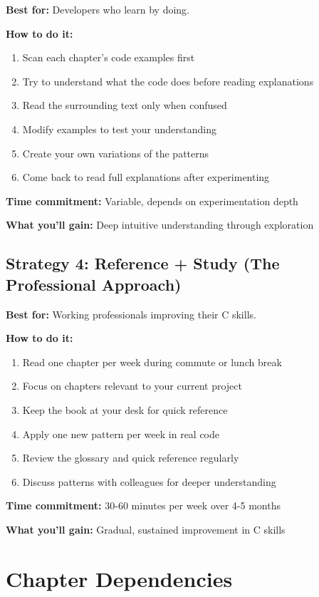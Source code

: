 \documentclass[10pt,openany]{book}
\begin{document}
\textbf{Best for:} Developers who learn by doing.

\textbf{How to do it:}
\begin{enumerate}
    \item Scan each chapter's code examples first
    \item Try to understand what the code does before reading explanations
    \item Read the surrounding text only when confused
    \item Modify examples to test your understanding
    \item Create your own variations of the patterns
    \item Come back to read full explanations after experimenting
\end{enumerate}

\textbf{Time commitment:} Variable, depends on experimentation depth

\textbf{What you'll gain:} Deep intuitive understanding through exploration

\subsection*{Strategy 4: Reference + Study (The Professional Approach)}

\textbf{Best for:} Working professionals improving their C skills.

\textbf{How to do it:}
\begin{enumerate}
    \item Read one chapter per week during commute or lunch break
    \item Focus on chapters relevant to your current project
    \item Keep the book at your desk for quick reference
    \item Apply one new pattern per week in real code
    \item Review the glossary and quick reference regularly
    \item Discuss patterns with colleagues for deeper understanding
\end{enumerate}

\textbf{Time commitment:} 30-60 minutes per week over 4-5 months

\textbf{What you'll gain:} Gradual, sustained improvement in C skills

\section*{Chapter Dependencies}
\end{document}
